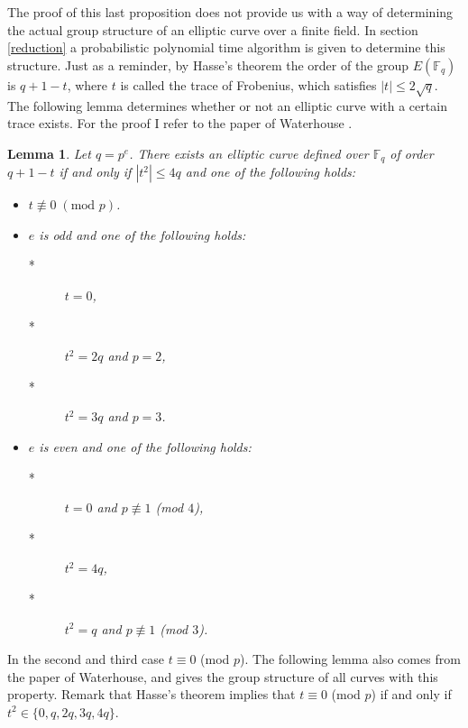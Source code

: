 \documentclass{article}
\numberwithin{equation}{section}
\newtheorem{lemma}[theorem]{Lemma}
\theoremstyle{definition}
\newcommand{\FF}[1]{{\mathbb F}_{#1}} %
\begin{document}
The proof of this last proposition does not provide us with a way of determining the actual group structure of an elliptic curve over a finite field. In section \ref{reduction} a probabilistic polynomial time algorithm is given to determine this structure. Just as a reminder, by Hasse's theorem the order of the group $E(\FF{q})$ is $q+1-t$, where $t$ is called the trace of Frobenius, which satisfies $|t| \leq 2 \sqrt{q}$. The following lemma determines whether or not an elliptic curve with a certain trace exists. For the proof I refer to the paper of Waterhouse \cite[4.2]{Waterhouse}.

\begin{lemma}\label{allcurvestructures}
Let $q=p^e$. There exists an elliptic curve defined over $\FF{q}$ of order $q+1-t$ if and only if $|t^2| \leq 4q$ and one of the following holds: 
\begin{itemize}
\item $t \not\equiv 0 \; (\text{mod } p)$.
\item $e$ is odd and one of the following holds:
\begin{description}
\item[*] $t=0$,
\item[*] $t^2 = 2q$ and $p=2$,
\item[*] $t^2 = 3q$ and $p=3$.
\end{description}
\item $e$ is even and one of the following holds:
\begin{description}
\item[*] $t=0$ and $p \not\equiv 1$ (mod $4$),
\item[*] $t^2 = 4q$,
\item[*] $t^2 = q$ and $p \not\equiv 1$ (mod $3$).
\end{description}
\end{itemize}
\end{lemma}

In the second and third case $t \equiv 0$ (mod $p$). The following lemma also comes from the paper \cite[4.8]{Waterhouse} of Waterhouse, and gives the group structure of all curves with this property. Remark that Hasse's theorem implies that $t \equiv 0$ (mod $p$) if and only if $t^2 \in \{0,q,2q,3q,4q\}$.
\end{document}
